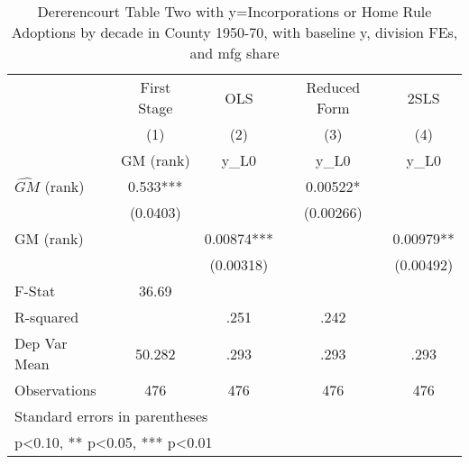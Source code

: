 \begin{table}[htbp]\centering
\def\sym#1{\ifmmode^{#1}\else\(^{#1}\)\fi}
\caption{Dererencourt Table Two with y=Incorporations or Home Rule Adoptions by decade in County 1950-70, with baseline y, division FEs, and mfg share}
\begin{tabular}{l*{4}{c}}
\toprule
                    & First Stage   &         OLS   &Reduced Form   &        2SLS   \\
                    &\multicolumn{1}{c}{(1)}&\multicolumn{1}{c}{(2)}&\multicolumn{1}{c}{(3)}&\multicolumn{1}{c}{(4)}\\
                    &\multicolumn{1}{c}{GM  (rank)}&\multicolumn{1}{c}{y\_L0}&\multicolumn{1}{c}{y\_L0}&\multicolumn{1}{c}{y\_L0}\\
\midrule
$\hat{GM}$ (rank)   &       0.533***&               &     0.00522*  &               \\
                    &    (0.0403)   &               &   (0.00266)   &               \\
\addlinespace
GM  (rank)          &               &     0.00874***&               &     0.00979** \\
                    &               &   (0.00318)   &               &   (0.00492)   \\
\midrule
F-Stat              &       36.69   &               &               &               \\
R-squared           &               &        .251   &        .242   &               \\
Dep Var Mean        &      50.282   &        .293   &        .293   &        .293   \\
Observations        &         476   &         476   &         476   &         476   \\
\bottomrule
\multicolumn{5}{l}{\footnotesize Standard errors in parentheses}\\
\multicolumn{5}{l}{\footnotesize * p<0.10, ** p<0.05, *** p<0.01}\\
\end{tabular}
\end{table}
